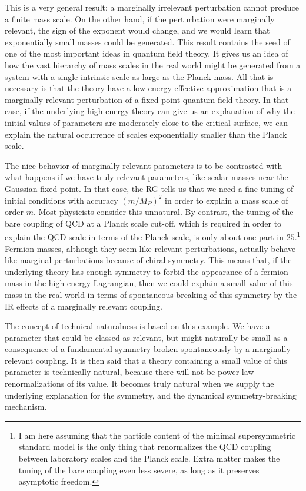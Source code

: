 This is a very general result: a marginally irrelevant perturbation cannot
produce a finite mass scale. On the other hand, if the perturbation were
marginally relevant, the sign of the exponent would change, and we would learn
that exponentially small masses could be generated. This result contains the
seed of one of the most important ideas in quantum field theory. It gives us an
idea of how the vast hierarchy of mass scales in the real world might be
generated from a system with a single intrinsic scale as large as the Planck
mass. All that is necessary is that the theory have a low-energy effective
approximation that is a marginally relevant perturbation of a fixed-point
quantum field theory. In that case, if the underlying high-energy theory can
give us an explanation of why the initial values of parameters are moderately
close to the critical surface, we can explain the natural occurrence of scales
exponentially smaller than the Planck scale.

The nice behavior of marginally relevant parameters is to be contrasted with
what happens if we have truly relevant parameters, like scalar masses near the
Gaussian fixed point. In that case, the RG tells us that we need a fine tuning
of initial conditions with accuracy $(m/M_P)^2$ in order to explain a mass
scale of order $m$. Most physicists consider this unnatural. By contrast, the
tuning of the bare coupling of QCD at a Planck scale cut-off, which is required
in order to explain the QCD scale in terms of the Planck scale, is only about
one part in $25$.\footnote[17]{I am here assuming that the particle content of the
minimal supersymmetric standard model is the only thing that renormalizes the
QCD coupling between laboratory scales and the Planck scale. Extra matter makes
the tuning of the bare coupling even less severe, as long as it preserves
asymptotic freedom.} Fermion masses, although they seem like relevant
perturbations, actually behave like marginal perturbations because of chiral
symmetry. This means that, if the underlying theory has enough symmetry to
forbid the appearance of a fermion mass in the high-energy Lagrangian, then we
could explain a small value of this mass in the real world in terms of
spontaneous breaking of this symmetry by the IR effects of a marginally
relevant coupling.

The concept of technical naturalness is based on this example. We have a
parameter that could be classed as relevant, but might naturally be small as a
consequence of a fundamental symmetry broken spontaneously by a marginally
relevant coupling. It is then said that a theory containing a small value of
this parameter is technically natural, because there will not be power-law
renormalizations of its value. It becomes truly natural when we supply the
underlying explanation for the symmetry, and the dynamical symmetry-breaking
mechanism.

